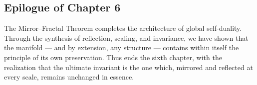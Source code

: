 \subsection*{Epilogue of Chapter 6}\relax \hspace{0pt}

The Mirror–Fractal Theorem completes the architecture
of global self-duality.
Through the synthesis of reflection, scaling, and invariance,
we have shown that the manifold — and by extension, any structure —
contains within itself the principle of its own preservation.
Thus ends the sixth chapter, with the realization that
the ultimate invariant is the one which,
mirrored and reflected at every scale,
remains unchanged in essence.

